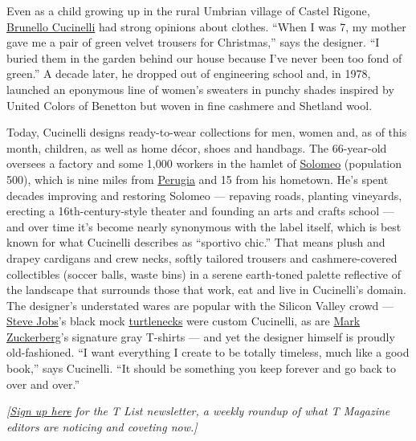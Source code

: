 Even as a child growing up in the rural Umbrian village of Castel
Rigone, \href{http://www.brunellocucinelli.com/en/}{Brunello Cucinelli}
had strong opinions about clothes. ``When I was 7, my mother gave me a
pair of green velvet trousers for Christmas,'' says the designer. ``I
buried them in the garden behind our house because I've never been too
fond of green.'' A decade later, he dropped out of engineering school
and, in 1978, launched an eponymous line of women's sweaters in punchy
shades inspired by United Colors of Benetton but woven in fine cashmere
and Shetland wool.

Today, Cucinelli designs ready-to-wear collections for men, women and,
as of this month, children, as well as home décor, shoes and handbags.
The 66-year-old oversees a factory and some 1,000 workers in the hamlet
of
\href{https://www.nytimes.com/2018/09/21/fashion/brunello-cucinelli-italy.html}{Solomeo}
(population 500), which is nine miles from
\href{https://www.nytimes.com/interactive/2017/09/14/travel/what-to-do-36-hours-in-perugia-italy.html}{Perugia}
and 15 from his hometown. He's spent decades improving and restoring
Solomeo --- repaving roads, planting vineyards, erecting a
16th-century-style theater and founding an arts and crafts school ---
and over time it's become nearly synonymous with the label itself, which
is best known for what Cucinelli describes as ``sportivo chic.'' That
means plush and drapey cardigans and crew necks, softly tailored
trousers and cashmere-covered collectibles (soccer balls, waste bins) in
a serene earth-toned palette reflective of the landscape that surrounds
those that work, eat and live in Cucinelli's domain. The designer's
understated wares are popular with the Silicon Valley crowd ---
\href{https://www.nytimes.com/topic/person/steve-jobs}{Steve Jobs}'s
black mock
\href{https://www.nytimes.com/2016/01/03/magazine/can-the-turtleneck-ever-be-cool-again.html}{turtlenecks}
were custom Cucinelli, as are
\href{https://www.nytimes.com/topic/person/mark-zuckerberg}{Mark
Zuckerberg}'s signature gray T-shirts --- and yet the designer himself
is proudly old-fashioned. ``I want everything I create to be totally
timeless, much like a good book,'' says Cucinelli. ``It should be
something you keep forever and go back to over and over.''

\emph{{[}}\href{https://www.nytimes.com/newsletters/t-list?module=inline}{\emph{Sign
up here}} \emph{for the T List newsletter, a weekly roundup of what T
Magazine editors are noticing and coveting now.{]}}

